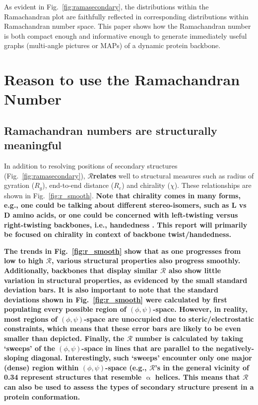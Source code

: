 \documentclass[fleqn,10pt,lineno]{wlpeerj} %
\newcommand{\Fig}[1]{Fig.~\ref{#1}}
\newcommand{\n}[1]{{\textbf{\color{red}#1}}}
\newcommand{\rr}{$\mathcal{R}$\xspace}
\begin{document}

As evident in \Fig{fig:ramasecondary}, the distributions within the Ramachandran plot are faithfully reflected in corresponding distributions within Ramachandran number space. This paper shows how the Ramachandran number is both compact enough and informative enough to generate immediately useful graphs (multi-angle pictures or MAPs) of a dynamic protein backbone.

\section*{Reason to use the Ramachandran Number}

\subsection*{Ramachandran numbers are structurally meaningful}
In addition to resolving positions of secondary structures (\Fig{fig:ramasecondary}), \rr \n{relates} well to structural measures such as radius of gyration ($R_g$), end-to-end distance ($R_e$) and chirality ($\chi$). These relationships are shown in \Fig{fig:r_smooth}. 
\n{Note that chirality comes in many forms, e.g., one could be talking about different stereo-isomers, such as L vs D amino acids, or one could be concerned with left-twisting versus right-twisting backbones, i.e., handedness \cite{Mannige2017}. This report will primarily be focused on chirality in context of backbone twist/handedness.}

\n{The trends in \Fig{fig:r_smooth} show that as one progresses from low to high \rr, various structural properties also progress smoothly. Additionally, backbones that display similar \rr also show little variation in structural properties, as evidenced by the small standard deviation bars. It is also important to note that the standard deviations shown in \Fig{fig:r_smooth} were calculated by first populating every possible region of $(\phi,\psi)$-space. However, in reality, most regions of $(\phi,\psi)$-space are unoccupied due to steric/electrostatic constraints, which means that these error bars are likely to be even smaller than depicted. Finally, the \rr number is calculated by taking `sweeps' of the  $(\phi,\psi)$-space in lines that are parallel to the negatively-sloping diagonal. Interestingly, such `sweeps' encounter only one major (dense) region within $(\phi,\psi)$-space (e.g., $\mathcal{R}$'s in the general vicinity of 0.34 represent structures that resemble $\upalpha$ helices. This means that \rr can also be used to assess the types of secondary structure present in a protein conformation.}
\end{document}
